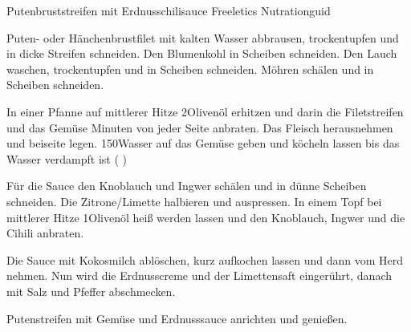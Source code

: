\begin{recipe}[]{ Putenbruststreifen mit Erdnusschilisauce }{ Freeletics Nutrationguid }



\step
Puten- oder Hänchenbrustfilet mit kalten Wasser abbrausen, trockentupfen und in \cm dicke Streifen schneiden. Den Blumenkohl in Scheiben schneiden. Den Lauch waschen, trockentupfen und in Scheiben schneiden. Möhren schälen und in Scheiben schneiden.
 
\step
In einer Pfanne auf mittlerer Hitze 2\TL Olivenöl erhitzen und darin die Filetstreifen und das Gemüse  Minuten von jeder Seite anbraten. Das Fleisch herausnehmen und beiseite legen. 150\ml Wasser auf das Gemüse geben und köcheln lassen bis das Wasser verdampft ist ( \min)

\step
Für die Sauce den Knoblauch und Ingwer schälen und in dünne Scheiben schneiden. Die Zitrone/Limette halbieren und auspressen. In einem Topf bei mittlerer Hitze 1\TL Olivenöl heiß werden lassen und den Knoblauch, Ingwer und die Cihili  \min anbraten.

\step
Die Sauce mit Kokosmilch ablöschen, kurz aufkochen lassen und dann vom Herd nehmen. Nun wird die Erdnusscreme und der Limettensaft eingerührt, danach mit Salz und Pfeffer abschmecken.

\step
Putenstreifen mit Gemüse und Erdnusssauce anrichten und  genießen.


\end{recipe}